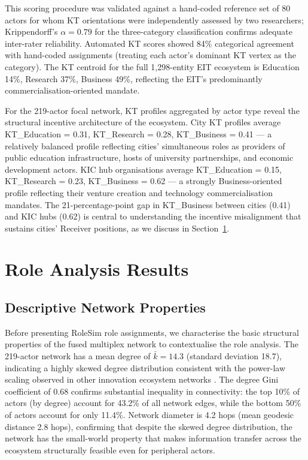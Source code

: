 \documentclass[review,12pt]{elsarticle}
\begin{document}
This scoring procedure was validated against a hand-coded reference set of 80 actors for whom KT orientations were independently assessed by two researchers; Krippendorff's $\alpha = 0.79$ for the three-category classification confirms adequate inter-rater reliability. Automated KT scores showed 84\% categorical agreement with hand-coded assignments (treating each actor's dominant KT vertex as the category). The KT centroid for the full 1{,}298-entity EIT ecosystem is Education 14\%, Research 37\%, Business 49\%, reflecting the EIT's predominantly commercialisation-oriented mandate.

For the 219-actor focal network, KT profiles aggregated by actor type reveal the structural incentive architecture of the ecosystem. City KT profiles average KT\_Education = 0.31, KT\_Research = 0.28, KT\_Business = 0.41 --- a relatively balanced profile reflecting cities' simultaneous roles as providers of public education infrastructure, hosts of university partnerships, and economic development actors. KIC hub organisations average KT\_Education = 0.15, KT\_Research = 0.23, KT\_Business = 0.62 --- a strongly Business-oriented profile reflecting their venture creation and technology commercialisation mandates. The 21-percentage-point gap in KT\_Business between cities (0.41) and KIC hubs (0.62) is central to understanding the incentive misalignment that sustains cities' Receiver positions, as we discuss in Section~\ref{sec:results}.

\section{Role Analysis Results}
\label{sec:results}

\subsection{Descriptive Network Properties}

Before presenting RoleSim role assignments, we characterise the basic structural properties of the fused multiplex network to contextualise the role analysis. The 219-actor network has a mean degree of $\bar{k} = 14.3$ (standard deviation 18.7), indicating a highly skewed degree distribution consistent with the power-law scaling observed in other innovation ecosystem networks \citep{barabasi1999emergence}. The degree Gini coefficient of 0.68 confirms substantial inequality in connectivity: the top 10\% of actors (by degree) account for 43.2\% of all network edges, while the bottom 50\% of actors account for only 11.4\%. Network diameter is 4.2 hops (mean geodesic distance 2.8 hops), confirming that despite the skewed degree distribution, the network has the small-world property \citep{watts1998collective} that makes information transfer across the ecosystem structurally feasible even for peripheral actors.
\end{document}
